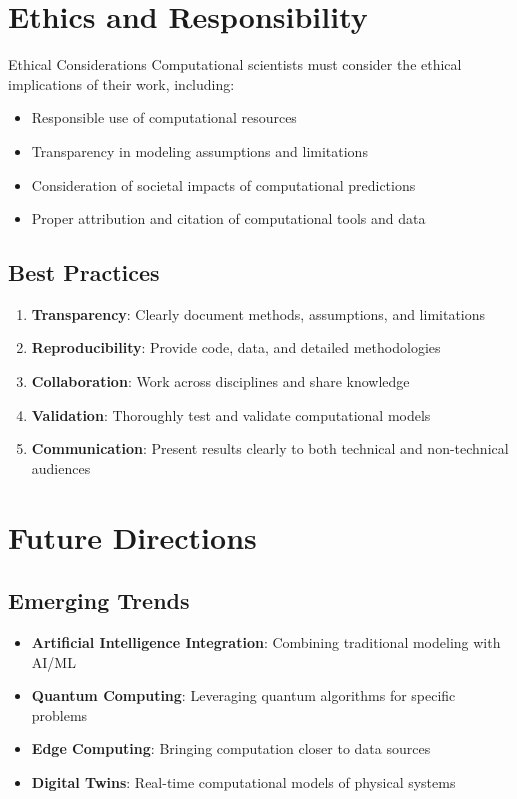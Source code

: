 \section{Ethics and Responsibility}

\begin{warningbox}{Ethical Considerations}
Computational scientists must consider the ethical implications of their work, including:
\begin{itemize}
  \item Responsible use of computational resources
  \item Transparency in modeling assumptions and limitations
  \item Consideration of societal impacts of computational predictions
  \item Proper attribution and citation of computational tools and data
\end{itemize}
\end{warningbox}

\subsection{Best Practices}
\begin{enumerate}
  \item \textbf{Transparency}: Clearly document methods, assumptions, and limitations
  \item \textbf{Reproducibility}: Provide code, data, and detailed methodologies
  \item \textbf{Collaboration}: Work across disciplines and share knowledge
  \item \textbf{Validation}: Thoroughly test and validate computational models
  \item \textbf{Communication}: Present results clearly to both technical and non-technical audiences
\end{enumerate}

\section{Future Directions}

\subsection{Emerging Trends}
\begin{itemize}
  \item \textbf{Artificial Intelligence Integration}: Combining traditional modeling with AI/ML
  \item \textbf{Quantum Computing}: Leveraging quantum algorithms for specific problems
  \item \textbf{Edge Computing}: Bringing computation closer to data sources
  \item \textbf{Digital Twins}: Real-time computational models of physical systems
\end{itemize}

